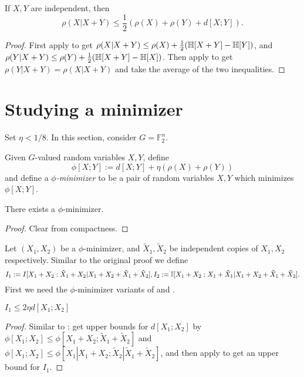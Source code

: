 \begin{lemma}\label{rho-cond-sym}
  If $X,Y$ are independent, then
  $$ \rho(X | X+Y) \leq \frac{1}{2}(\rho(X)+\rho(Y) + d[X;Y]).$$
\end{lemma}
\begin{proof}
  First apply  to get $\rho(X|X+Y)\le \rho(X) + \frac{1}{2}(\mathbb{H}[X+Y]-\mathbb{H}[Y])$, and $\rho(Y|X+Y)\le \rho(Y)+\frac{1}{2}(\mathbb{H}[X+Y]-\mathbb{H}[X])$. Then apply  to get $\rho(Y|X+Y)=\rho(X|X+Y)$ and take the average of the two inequalities.
\end{proof}

\section{Studying a minimizer}

Set $\eta < 1/8$. In this section, consider $G=\mathbb{F}_2^n$.

\begin{definition}\label{phi-min-def}  Given $G$-valued random variables $X,Y$, define
$$ \phi[X;Y] := d[X;Y] + \eta(\rho(X) + \rho(Y))$$
and define a \emph{$\phi$-minimizer} to be a pair of random variables $X,Y$ which minimizes $\phi[X;Y]$.
\end{definition}

\begin{lemma}\label{phi-min-exist}  There exists a $\phi$-minimizer.
\end{lemma}

\begin{proof} Clear from compactness.
\end{proof}

Let $(X_1, X_2)$ be a $\phi$-minimizer, and $\tilde X_1, \tilde X_2$ be independent copies of $X_1,X_2$ respectively.  
Similar to the original proof we define
$$ I_1 :=  I [X_1+X_2 : \tilde X_1 + X_2 | X_1+X_2+\tilde X_1+\tilde X_2], I_2 := \mathbb{I}[X_1+X_2 : X_1 + \tilde X_1 | X_1+X_2+\tilde X_1+\tilde X_2].$$ 
First we need the $\phi$-minimizer variants of  and . 
\begin{lemma}\label{phi-first-estimate}
$I_1\le 2\eta d[X_1;X_2]$
\end{lemma}
\begin{proof}
Similar to : get upper bounds for $d[X_1;X_2]$ by $\phi[X_1;X_2]\le \phi[X_1+X_2;\tilde X_1+\tilde X_2]$ and $\phi[X_1;X_2]\le \phi[X_1|X_1+X_2;\tilde X_2|\tilde X_1+\tilde X_2]$, and then apply  to get an upper bound for $I_1$.
\end{proof}

